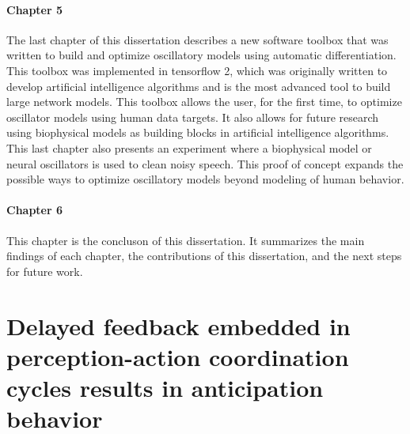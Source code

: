 \documentclass{report}
\begin{document}
\subsubsection{Chapter 5}
The last chapter of this dissertation describes a new software toolbox that was written to build and optimize oscillatory models using automatic differentiation. This toolbox was implemented in tensorflow 2, which was originally written to develop artificial intelligence algorithms and is the most advanced tool to build large network models. This toolbox allows the user, for the first time, to optimize oscillator models using human data targets. It also allows for future research using biophysical models as building blocks in artificial intelligence algorithms. This last chapter also presents an experiment where a biophysical model or neural oscillators is used to clean noisy speech. This proof of concept expands the possible ways to optimize oscillatory models beyond modeling of human behavior. 

\subsubsection{Chapter 6}
This chapter is the concluson of this dissertation. It summarizes the main findings of each chapter, the contributions of this dissertation, and the next steps for future work.



\chapter{Delayed feedback embedded in perception-action coordination cycles results in anticipation behavior}
\end{document}
